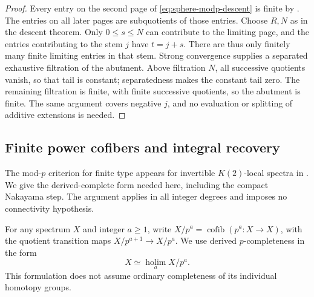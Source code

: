 
\begin{proof}
Every entry on the second page of \eqref{eq:sphere-modp-descent} is finite
by .  The entries on all later pages are
subquotients of those entries.  Choose $R,N$ as in the descent theorem.
Only $0\leq s\leq N$ can contribute to the limiting page, and the entries
contributing to the stem $j$ have $t=j+s$.  There are thus only finitely
many finite limiting entries in that stem.  Strong convergence supplies
a separated exhaustive filtration of the abutment. Above filtration
$N$, all successive quotients vanish, so that tail is constant;
separatedness makes the constant tail zero. The remaining filtration
is finite, with finite successive quotients, so the abutment is finite.  The same argument covers negative
$j$, and no evaluation or splitting of additive extensions is needed.
\end{proof}

\subsection{Finite power cofibers and integral recovery}

The mod-$p$ criterion for finite type appears for invertible
$K(2)$-local spectra in \citet[Proposition~3.1]{liFiniteType2021}.
We give the derived-complete form needed here, including the compact
Nakayama step. The argument applies in all integer degrees and imposes
no connectivity hypothesis.

For any spectrum $X$ and integer $a\geq1$, write
$X/p^a=\operatorname{cofib}(p^a:X\to X)$, with the quotient transition
maps $X/p^{a+1}\to X/p^a$.  We use derived $p$-completeness in the form
\[
 X\simeq\operatorname*{holim}_a X/p^a.
\]
This formulation does not assume ordinary completeness of its individual
homotopy groups.


